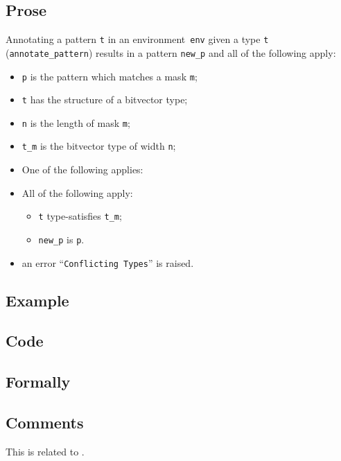\documentclass{book}
\begin{document}
  \subsection{Prose}
   Annotating a pattern \texttt{t} in an environment~\texttt{env} given a type \texttt{t} (\texttt{annotate\_pattern}) results in a pattern \texttt{new\_p} and all of the following apply:
   \begin{itemize}
   \item \texttt{p} is the pattern which matches a mask \texttt{m};
   \item \texttt{t} has the structure of a bitvector type;
   \item \texttt{n} is the length of mask \texttt{m};
   \item \texttt{t\_m} is the bitvector type of width \texttt{n};
   \item One of the following applies:
     \item All of the following apply:
       \begin{itemize}
       \item \texttt{t} type-satisfies \texttt{t\_m};
       \item \texttt{new\_p} is \texttt{p}.
       \end{itemize}
     \item an error ``\texttt{Conflicting Types}'' is raised.
   \end{itemize}

  \subsection{Example}

  \subsection{Code}

\begin{emptyformal}
    \subsection{Formally}
\end{emptyformal}

\subsection{Comments}
  This is related to .
\end{document}
